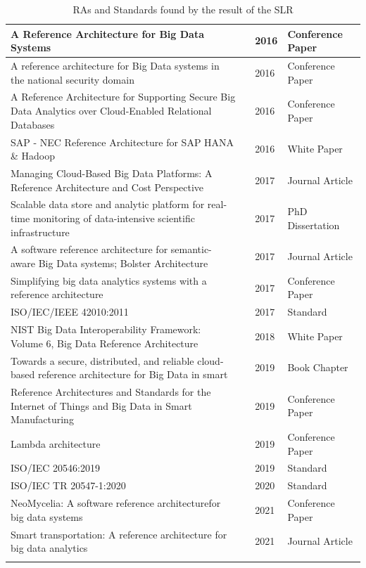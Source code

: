 \documentclass{bmcart}
\begin{document}
\begin{longtable}{|p{5cm} | p{1cm}  | p{1cm} | p{3.4cm}|}
    \hline
    A Reference Architecture for Big Data Systems  & \cite{sang2016reference}  & 2016 & Conference Paper  \\
    \hline
    A reference architecture for Big Data systems in the national security domain  & \cite{klein2016reference}  & 2016 & Conference Paper \\ [1ex]
    \hline
    A Reference Architecture for Supporting Secure Big Data Analytics over Cloud-Enabled Relational Databases  & \cite{cuzzocrea2016reference}  & 2016 & Conference Paper \\ [1ex]
    \hline
    SAP - NEC Reference Architecture for SAP HANA \& Hadoop   &
    \cite{SAPRA} & 2016 & White Paper \\ [1ex]
    \hline
    Managing Cloud-Based Big Data Platforms: A Reference Architecture and Cost Perspective  & \cite{heilig2017managing} & 2017 & Journal Article \\ [1ex]
    \hline
    Scalable data store and analytic platform for real-time monitoring of data-intensive scientific infrastructure   & \cite{heilig2017managing} & 2017 & PhD Dissertation \\ [1ex]
    \hline
    A software reference architecture for semantic-aware Big Data systems; Bolster Architecture   & \cite{nadal2017software} & 2017 & Journal Article \\ [1ex]
    \hline
    Simplifying big data analytics systems with a reference architecture
    &
    \cite{sang2017simplifying} & 2017 & Conference Paper \\ [1ex]
    \hline
    ISO/IEC/IEEE 42010:2011 & \cite{ISO42010} & 2017 & Standard \\ [1ex]
    \hline
    NIST Big Data Interoperability Framework: Volume 6, Big Data Reference Architecture
    & \cite{Chang} & 2018 & White Paper \\ [1ex]
    \hline
    Towards a secure, distributed, and reliable cloud-based reference architecture for Big Data in smart   & \cite{kohler2019towards} & 2019 & Book Chapter \\ [1ex]
    \hline
    Reference Architectures and Standards for the Internet of Things and Big Data in Smart Manufacturing   & \cite{unal2019reference} & 2019 & Conference Paper \\ [1ex]
    \hline
    Lambda architecture & \cite{kiran2015lambda} & 2019 & Conference Paper \\ [1ex]
    \hline
    ISO/IEC 20546:2019 & \cite{ISO20546} & 2019 & Standard \\ [1ex]
    \hline
    ISO/IEC TR 20547-1:2020 & \cite{ISO20547} & 2020 & Standard \\ [1ex]
    \hline
    NeoMycelia: A software reference architecturefor big data systems
    &
    \cite{AtaeiApsec} & 2021 & Conference Paper \\ [1ex]
    \hline
    Smart transportation: A reference architecture for big data analytics
    &
    \cite{castellanos2021smart} & 2021 & Journal Article \\ [1ex]
    \hline
    \caption{RAs and Standards found by the result of the SLR}
    \label{table:SLR}
\end{longtable}
\end{document}
